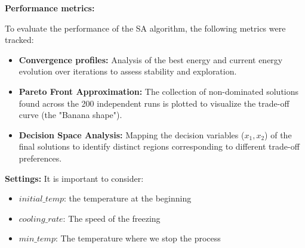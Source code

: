 \textbf{Performance metrics:}

To evaluate the performance of the SA algorithm, the following metrics were tracked:
\begin{itemize}
    \item \textbf{Convergence profiles:} Analysis of the best energy and current energy evolution over iterations to assess stability and exploration.
    \item \textbf{Pareto Front Approximation:} The collection of non-dominated solutions found across the 200 independent runs is plotted to visualize the trade-off curve (the "Banana shape").
    \item \textbf{Decision Space Analysis:} Mapping the decision variables ($x_1, x_2$) of the final solutions to identify distinct regions corresponding to different trade-off preferences.
\end{itemize}

\textbf{Settings:}
It is important to consider:
\begin{itemize}
    \item $initial\_temp$: the temperature at the beginning
    \item $cooling\_rate$: The speed of the freezing
    \item $min\_temp$: The temperature where we stop the process
\end{itemize}
